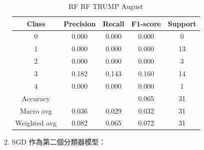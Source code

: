 \begin{enumerate}
\begin{enumerate}
\begin{table}[H]
                \vspace{1em}
                
                \scriptsize
                \begin{tabular}{c|cccc}
                \hline
                Class & Precision & Recall & F1-score & Support \\
                \hline
                0 & 0.000 & 0.000 & 0.000 & 0 \\
                1 & 0.000 & 0.000 & 0.000 & 13 \\
                2 & 0.000 & 0.000 & 0.000 & 3 \\
                3 & 0.182 & 0.143 & 0.160 & 14 \\
                4 & 0.000 & 0.000 & 0.000 & 1 \\
                \hline
                Accuracy &       &      & 0.065 & 31 \\
                Macro avg & 0.036 & 0.029 & 0.032 & 31 \\
                Weighted avg & 0.082 & 0.065 & 0.072 & 31 \\
                \hline
                \end{tabular}
                \caption{RF RF TRUMP August}
                \label{tab:classifier_2_report_rf_rf_trump_non_filtered_aug}
                \end{table}



                \pagebreak
    
                \item SGD 作為第二個分類器模型：


\end{enumerate}
\end{enumerate}
